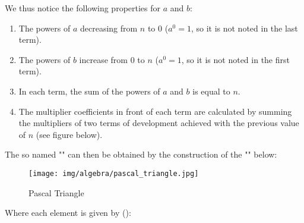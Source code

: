 	We thus notice the following properties for $a$ and $b$:
	\begin{enumerate}
		\item The powers of $a$ decreasing from $n$ to $0$ ($a^0=1$, so it is not noted in the last term).
		
		\item The powers of $b$ increase from $0$ to $n$ ($a^0=1$, so it is not noted in the first term).
		
		\item In each term, the sum of the powers of $a$ and $b$ is equal to $n$.
		
		\item The multiplier coefficients in front of each term are calculated by summing the multipliers of two terms of development achieved with the previous value of $n$ (see figure below).
	\end{enumerate}
	The so named "" can then be obtained by the construction of the "\label{Pascal's triangle}" below:
	\begin{figure}[H]
		\centering
		\texttt{[image: img/algebra/pascal\_triangle.jpg]}
		\caption{Pascal Triangle}
	\end{figure}
	Where each element is given by ():
	
